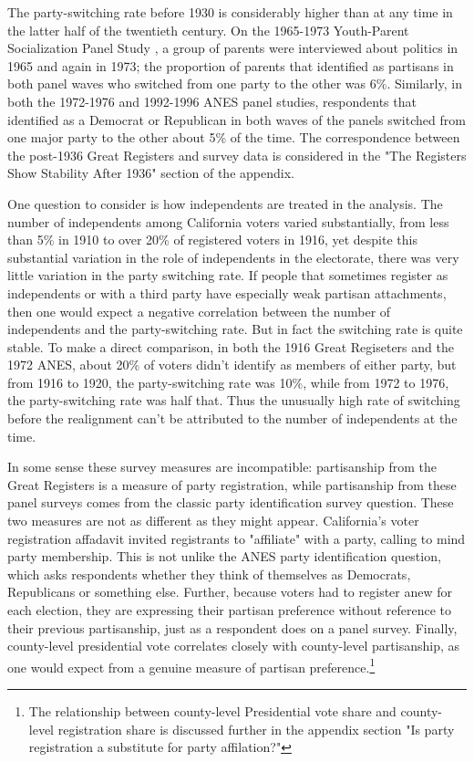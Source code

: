 \documentclass[11pt]{scrartcl}\usepackage[]{graphicx}\usepackage[]{color}
\begin{document}
The party-switching rate before 1930 is considerably higher than at any time in the latter half of the twentieth century. On the 1965-1973 Youth-Parent Socialization Panel Study \citep{jennings1981youth}, a group of parents  were interviewed about politics in 1965 and again in 1973; the proportion of parents that identified as partisans in both panel waves who switched from one party to the other was 6\%.  Similarly, in both the 1972-1976 and 1992-1996 ANES panel studies, respondents that identified as a Democrat or Republican in both waves of the panels switched from one major party to the other about 5\% of the time.  The correspondence between the post-1936 Great Registers and survey data is considered in the "The Registers Show Stability After 1936" section of the appendix.

One question to consider is how independents are treated in the analysis.  The number of independents among California voters varied substantially, from less than 5\% in 1910 to over 20\% of registered voters in 1916, yet despite this substantial variation in the role of independents in the electorate, there was very little variation in the party switching rate. If people that sometimes register as independents or with a third party have especially weak partisan attachments, then one would expect a negative correlation between the number of independents and the party-switching rate. But in fact the switching rate is quite stable.  To make a direct comparison, in both the 1916 Great Regiseters and the 1972 ANES, about 20\% of voters didn't identify as members of either party, but from 1916 to 1920, the party-switching rate was 10\%, while from 1972 to 1976, the party-switching rate was half that. Thus the unusually high rate of switching before the realignment can't be attributed to the number of independents at the time.

In some sense these survey measures are incompatible: partisanship from the Great Registers is a measure of party registration, while partisanship from these panel surveys comes from the classic party identification survey question. These two measures are not as different as they might appear. California's voter registration affadavit invited registrants to "affiliate" with a party, calling to mind party membership. This is not unlike the ANES party identification question, which asks respondents whether they think of themselves as Democrats, Republicans or something else. Further, because voters had to register anew for each election, they are expressing their partisan preference without reference to their previous partisanship, just as a respondent does on a panel survey. Finally, county-level presidential vote correlates closely with county-level partisanship, as one would expect from a genuine measure of partisan preference.\footnote{The relationship between county-level Presidential vote share and county-level registration share is discussed further in the appendix section "Is party registration a substitute for party affilation?"}
\end{document}
